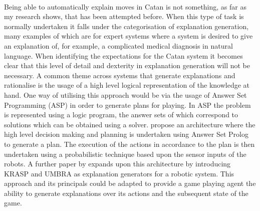 \documentclass[]{article}
\begin{document}
\paragraph{}
Being able to automatically explain moves in Catan is not something, as far as my research shows, that has been attempted before. When this type of task is normally undertaken it falls under the categorisation of explanation generation, many examples of which are for expert systems where a system is desired to give an explanation of, for example, a complicated medical diagnosis in natural language. When identifying the expectations for the Catan system it becomes clear that this level of detail and dexterity in explanation generation will not be necessary. A common theme across systems that generate explanations and rationalise is the usage of a high level logical representation of the knowledge at hand. One way of utilising this approach would be via the usage of Answer Set Programming (ASP) in order to generate plans \autocite{lifschitz2002answer} for playing. In ASP the problem is represented using a logic program, the answer sets of which correspond to solutions which can be obtained using a solver. \textcite{colaco2015happened} propose an architecture where the high level decision making and planning is undertaken using Answer Set Prolog to generate a plan. The execution of the actions in accordance to the plan is then undertaken using a probabilistic technique based upon the sensor inputs of the robots. A further paper by \textcite{sridharan2016tale} expands upon this architecture by introducing KRASP and UMBRA as explanation generators for a robotic system. This approach and its principals could be adapted to provide a game playing agent the ability to generate explanations over its actions and the subsequent state of the game.  
\end{document}

